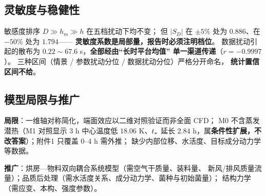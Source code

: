 \subsection{灵敏度与稳健性}

敏感度排序 $D\gg h_m\gg h$ 在五档扰动下均不变；
但 $|S_D|$ 在 $\pm5\%$ 处为 $0.886$、在 $-50\%$ 处为 $1.794$——
\textbf{灵敏度系数是局部量，报告时必须注明档位}。
数据扰动引起的散布为 $0.22\sim67.6$ s，\textbf{全部经由``长时平台均值''
单一渠道传递}（$r=-0.9997$）。
三种区间（情景 / 参数扰动分位 / 数据扰动分位）严格分开命名，
\textbf{统计置信区间不给}。

\subsection{模型局限与推广}

\textbf{局限}：一维轴对称简化，端面效应以二维对照验证而非全面 CFD；
M0 不含蒸发潜热（M1 对照显示 3 h 中心温度低 $18.06$ K、$t_{*}$ 延长
$2.84$ h，属\textbf{条件性扩展，不改答案}）；附件1 只覆盖 0--4 h 需外推；
缺少内部位移、水活度、目标成分动力学等数据。

\textbf{推广}：烘房—物料双向耦合系统模型（需空气干质量、装料量、
新风/排风质量流量）；品质后处理（需水活度关系、成分动力学、菌种与初始菌量）；
结构力学（需应变、本构、强度参数）。
